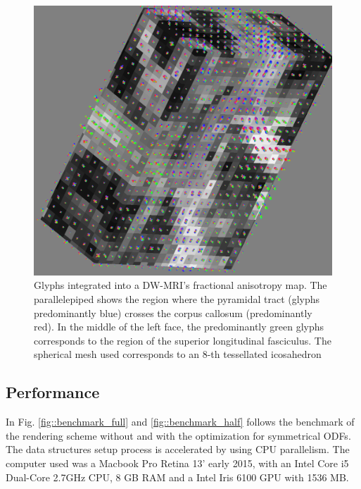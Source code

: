 \documentclass[twoside,twocolumn,10pt]{article}
\begin{document}
\begin{figure}[htb]
    \centering
    \includegraphics[width=1.00\linewidth, angle=0]{figs/Results/Glyphs_onFAMAP_2.png}
    \caption{Glyphs integrated into a DW-MRI's fractional anisotropy map. The parallelepiped shows the region where the pyramidal tract (glyphs predominantly blue) crosses the corpus callosum (predominantly red). In the middle of the left face, the predominantly green glyphs corresponds to the region of the superior longitudinal fasciculus. The spherical mesh used corresponds to an 8-th tessellated icosahedron}
    \label{fig::ex_glyph_FAMAP}
\end{figure}

\subsection{Performance}

In Fig. \ref{fig::benchmark_full} and \ref{fig::benchmark_half} follows the benchmark of the rendering scheme without and with the optimization for symmetrical ODFs. The data structures setup process is accelerated by using CPU parallelism. The computer used was a Macbook Pro Retina 13' early 2015, with an Intel Core i5 Dual-Core 2.7GHz CPU, 8 GB RAM and a Intel Iris 6100 GPU with 1536 MB.
\end{document}
